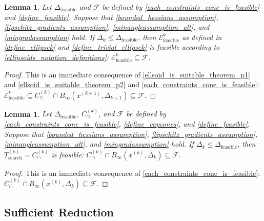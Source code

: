 \documentclass{article}
\newtheorem{lemma}[theorem]{Lemma}
\theoremstyle{case}
\numberwithin{theorem}{subsection}
\newcommand{\capcones}{{C^{(k)}_{\cap}}}
\newcommand{\dfeas}{{\Delta_{\textrm{feasible}}}}
\newcommand{\dk}{\Delta_k}
\newcommand{\dkpo}{\Delta_{k+1}}
\newcommand{\feasible}{{\mathcal F}}
\newcommand{\naturals}{\mathbb N}
\newcommand{\searchtrk}{{T_{\text{search}}^{(k)}}}
\newcommand{\tr}{{ B_{\infty}\left(\xk, \dk\right) }}
\newcommand{\trkpo}{{ B_{\infty}\left(\xkpo, \dkpo\right) }}
\newcommand{\unshiftedellipsoid}{{\mathcal E^k_{\textrm{feasible}}}}
\newcommand{\xkpo}{{{x}^{(k+1)}}}
\newcommand{\xk}{x^{(k)}}
\begin{document}
\begin{lemma}
\label{ellipsoid_is_feasible}
Let $\dfeas$ and $\feasible$
be defined by
\cref{each_constraints_cone_is_feasible} and
\cref{define_feasible}.
Suppose that 
\cref{bounded_hessians_assumption},
\cref{lipschitz_gradients_assumption},
\cref{minangleassumption_alt},
and \cref{mingradassumption} hold.
If $\dk \le \dfeas$, then $\unshiftedellipsoid$ as defined in \cref{define_ellipsek} and \cref{define_trivial_ellipsek} is feasible according to 
\cref{ellipsoids_notation_definitions}:
$\unshiftedellipsoid \subseteq \feasible$.
\end{lemma}

\begin{proof}
This is an immediate consequence of \cref{ellsoid_is_suitable_theorem_p1} and \cref{ellsoid_is_suitable_theorem_p2} and \cref{each_constraints_cone_is_feasible}:
$\unshiftedellipsoid \subseteq \capcones \cap \trkpo \subseteq \feasible$.
\end{proof}



\begin{lemma}
\label{searchtrk_is_feasible}
Let $\dfeas$, $\capcones$, and $\feasible$
be defined by
\cref{each_constraints_cone_is_feasible},
\cref{define_capcones},
and
\cref{define_feasible}.
Suppose that 
\cref{bounded_hessians_assumption},
\cref{lipschitz_gradients_assumption},
\cref{minangleassumption_alt},
and \cref{mingradassumption} hold.
If $\dk \le \dfeas$, then $\searchtrk = \capcones$ is feasible:
$\capcones \cap \tr \subseteq \feasible$.
\end{lemma}

\begin{proof}
This is an immediate consequence of \cref{each_constraints_cone_is_feasible}:
$\capcones \cap \tr \subseteq \feasible$.
\end{proof}






\subsection{Sufficient Reduction}
\label{sufficient_reduction_section}
\end{document}
